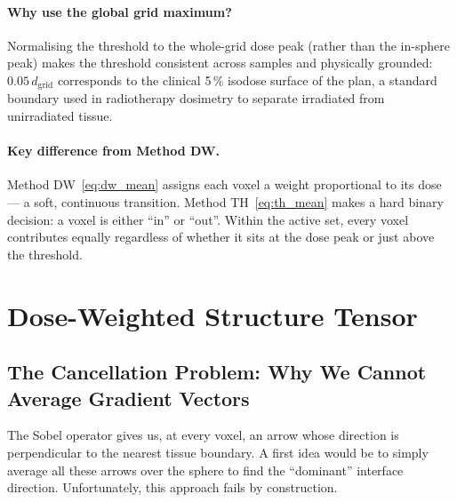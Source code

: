 \documentclass[11pt,a4paper]{article}
\begin{document}
\paragraph{Why use the global grid maximum?}
Normalising the threshold to the whole-grid dose peak (rather than the
in-sphere peak) makes the threshold consistent across samples and physically
grounded: $0.05\,d_{\mathrm{grid}}$ corresponds to the clinical 5\,\%
isodose surface of the plan, a standard boundary used in radiotherapy
dosimetry to separate irradiated from unirradiated tissue.

\paragraph{Key difference from Method DW.}
Method DW~\eqref{eq:dw_mean} assigns each voxel a weight proportional to
its dose — a soft, continuous transition.
Method TH~\eqref{eq:th_mean} makes a hard binary decision: a voxel is either
``in'' or ``out''.
Within the active set, every voxel contributes equally regardless of whether
it sits at the dose peak or just above the threshold.

\section{Dose-Weighted Structure Tensor}

\subsection{The Cancellation Problem: Why We Cannot Average Gradient Vectors}

The Sobel operator gives us, at every voxel, an arrow whose direction is
perpendicular to the nearest tissue boundary.
A first idea would be to simply average all these arrows over the sphere to
find the ``dominant'' interface direction.
Unfortunately, this approach fails by construction.
\end{document}
